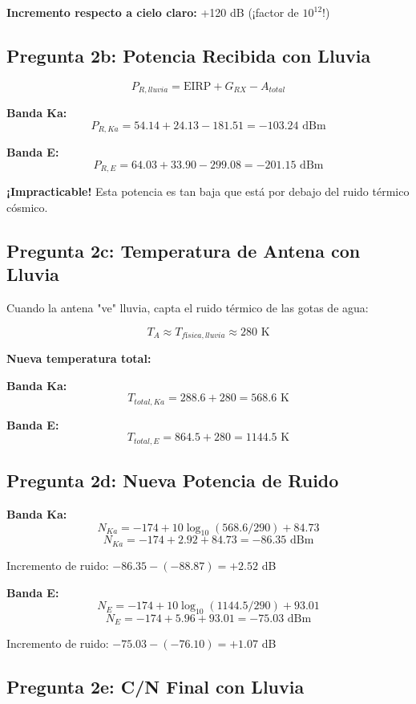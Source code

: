 \documentclass[a4paper,10pt]{article}
\begin{document}
\textbf{Incremento respecto a cielo claro:} +120 dB (¡factor de $10^{12}$!)

\subsection{Pregunta 2b: Potencia Recibida con Lluvia}

$$P_{R,lluvia} = \text{EIRP} + G_{RX} - A_{total}$$

\textbf{Banda Ka:}
$$P_{R,Ka} = 54.14 + 24.13 - 181.51 = \boxed{-103.24 \text{ dBm}}$$

\textbf{Banda E:}
$$P_{R,E} = 64.03 + 33.90 - 299.08 = \boxed{-201.15 \text{ dBm}}$$

\textbf{¡Impracticable!} Esta potencia es tan baja que está por debajo del ruido térmico cósmico.

\subsection{Pregunta 2c: Temperatura de Antena con Lluvia}

Cuando la antena "ve" lluvia, capta el ruido térmico de las gotas de agua:

$$T_A \approx T_{física,lluvia} \approx 280 \text{ K}$$

\textbf{Nueva temperatura total:}

\textbf{Banda Ka:}
$$T_{total,Ka} = 288.6 + 280 = \boxed{568.6 \text{ K}}$$

\textbf{Banda E:}
$$T_{total,E} = 864.5 + 280 = \boxed{1144.5 \text{ K}}$$

\subsection{Pregunta 2d: Nueva Potencia de Ruido}

\textbf{Banda Ka:}
$$N_{Ka} = -174 + 10\log_{10}(568.6/290) + 84.73$$
$$N_{Ka} = -174 + 2.92 + 84.73 = \boxed{-86.35 \text{ dBm}}$$

Incremento de ruido: $-86.35 - (-88.87) = +2.52$ dB

\textbf{Banda E:}
$$N_E = -174 + 10\log_{10}(1144.5/290) + 93.01$$
$$N_E = -174 + 5.96 + 93.01 = \boxed{-75.03 \text{ dBm}}$$

Incremento de ruido: $-75.03 - (-76.10) = +1.07$ dB

\subsection{Pregunta 2e: C/N Final con Lluvia}
\end{document}
